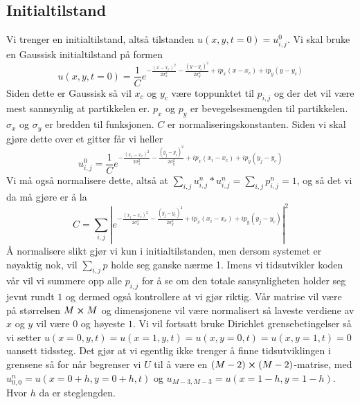 \documentclass[reprint,english,notitlepage]{revtex4-2}  %
\begin{document}
\subsection{Initialtilstand}
\label{ssec:Init}
Vi trenger en initialtilstand, altså tilstanden $u(x,y,t=0)=u^0_{i,j}$. Vi skal bruke en Gaussisk initialtilstand på formen
$$
u(x,y,t=0)=\frac{1}{C}e^{-\frac{(x-x_c)^2}{2\sigma_x^2}-\frac{(y-y_c)^2}{2\sigma_y^2}+ip_x(x-x_c)+ip_y(y-y_c)}
$$
Siden dette er Gaussisk så vil $x_c$ og $y_c$ være toppunktet til $p_{i,j}$ og der det vil være mest sannsynlig at partikkelen er. $p_x$ og $p_y$ er bevegelsesmengden til partikkelen. $\sigma_x$ og $\sigma_y$ er bredden til funksjonen. $C$ er normaliseringskonstanten. Siden vi skal gjøre dette over et gitter får vi heller
$$
u_{i,j}^0=\frac{1}{C}e^{-\frac{(x_i-x_c)^2}{2\sigma_x^2}-\frac{(y_j-y_c)^2}{2\sigma_y^2}+ip_x(x_i-x_c)+ip_y(y_j-y_c)}
$$
Vi må også normalisere dette, altså at $\sum_{i,j} u^n_{i,j}*u^n_{i,j}=\sum_{i,j}p^n_{i,j}=1$, og så det vi da må gjøre er å la
$$
C=\sum_{i,j}|e^{-\frac{(x_i-x_c)^2}{2\sigma_x^2}-\frac{(y_j-y_c)^2}{2\sigma_y^2}+ip_x(x_i-x_c)+ip_y(y_j-y_c)}|^2
$$
Å normalisere slikt gjør vi kun i initialtilstanden, men dersom systemet er nøyaktig nok, vil $\sum_{i,j}p$ holde seg ganske nærme 1. Imens vi tidsutvikler koden vår vil vi summere opp alle $p_{i,j}$ for å se om den totale sansynligheten holder seg jevnt rundt $1$ og dermed også kontrollere at vi gjør riktig.
\newline Vår matrise vil være på størrelsen $M\cross M$ og dimensjonene vil være normalisert så laveste verdiene av $x $ og $y$ vil være $0$ og høyeste $1$. Vi vil fortsatt bruke Dirichlet grensebetingelser så vi setter $u(x=0,y, t)=u(x=1,y, t)=u(x, y=0, t)=u(x,y=1, t)=0$ uansett tidssteg. Det gjør at vi egentlig ikke trenger å finne tidsutviklingen i grensene så for når begrenser vi $U$ til å være en $(M-2)\cross (M-2)$-matrise, med $u_{0,0}^n=u(x=0+h,y=0+h, t)$ og $u_{M-3,M-3}=u(x=1-h,y=1-h)$. Hvor $h$ da er steglengden.
\end{document}
